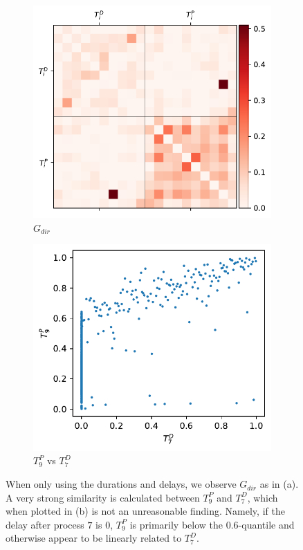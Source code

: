 \documentclass[../Thesis.tex]{subfiles}
\begin{document}
\begin{figure}[ht]
    \centering
    \begin{subfigure}[t]{0.49\linewidth}
        \includegraphics[width = \linewidth]{figures/Cycle data/G_dir times - symmetric.pdf}
        \caption{$G_{dir}$}
        \label{subfig:G_dir using only times}
    \end{subfigure}
    \hfill
    \begin{subfigure}[t]{0.49\linewidth}
        \includegraphics[width=\linewidth]{figures/Cycle data/G_dir times - symmetric - TP9 vs TD7.pdf}
        \caption{$T^P_9$ vs $T^D_7$}
        \label{subfig:G_dir times - TP9 vs TD7}
    \end{subfigure}
    \caption{When only using the durations and delays, we observe $G_{dir}$ as in (a). A very strong similarity is calculated between $T^P_9$ and $T^D_7$, which when plotted in (b) is not an unreasonable finding. Namely, if the delay after process $7$ is $0$, $T^P_9$ is primarily below the $0.6$-quantile and otherwise appear to be linearly related to $T^D_7$.}
    \label{fig:G_dir using only times}
\end{figure}
\end{document}
